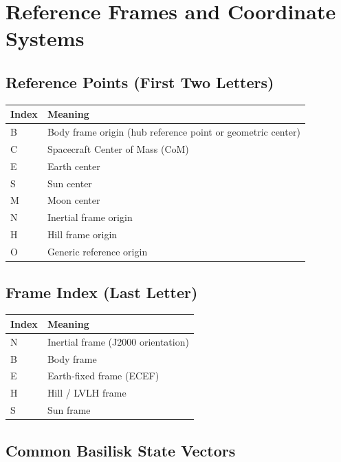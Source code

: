 \chapter{Reference Frames and Coordinate Systems}
\label{app:frames}

\section*{Reference Points (First Two Letters)}

\begin{tabular}{ll}
	\toprule
	Index & Meaning \\
	\midrule
	B & Body frame origin (hub reference point or geometric center) \\
	C & Spacecraft Center of Mass (CoM) \\
	E & Earth center \\
	S & Sun center \\
	M & Moon center \\
	N & Inertial frame origin \\
	H & Hill frame origin \\
	O & Generic reference origin \\
	\bottomrule
\end{tabular}

\section*{Frame Index (Last Letter)}

\begin{tabular}{ll}
	\toprule
	Index & Meaning \\
	\midrule
	N & Inertial frame (J2000 orientation) \\
	B & Body frame \\
	E & Earth-fixed frame (ECEF) \\
	H & Hill / LVLH frame \\
	S & Sun frame \\
	\bottomrule
\end{tabular}

\section*{Common Basilisk State Vectors}

